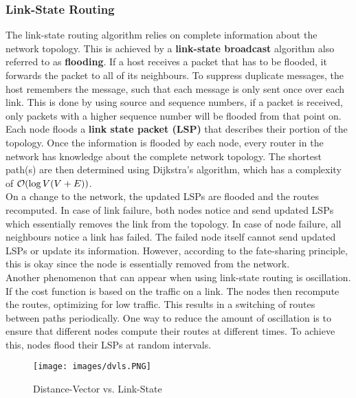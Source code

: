 \subsubsection{Link-State Routing}
The link-state routing algorithm relies on complete information about the network topology. This is achieved by a \textbf{link-state broadcast} algorithm also referred to as \textbf{flooding}. If a host receives a packet that has to be flooded, it forwards the packet to all of its neighbours. To suppress duplicate messages, the host remembers the message, such that each message is only sent once over each link. This is done by using source and sequence numbers, if a packet is received, only packets with a higher sequence number will be flooded from that point on. \vspace{.3cm}\\

Each node floods a \textbf{link state packet (LSP)} that describes their portion of the topology. Once the information is flooded by each node, every router in the network has knowledge about the complete network topology. The shortest path(s) are then determined using Dijkstra's algorithm, which has a complexity of $\mathcal{O}(\log V(V + E))$.\vspace{.3cm}\\

On a change to the network, the updated LSPs are flooded and the routes recomputed. In case of link failure, both nodes notice and send updated LSPs which essentially removes the link from the topology. In case of node failure, all neighbours notice a link has failed. The failed node itself cannot send updated LSPs or update its information. However, according to the fate-sharing principle, this is okay since the node is essentially removed from the network.\vspace{.3cm}\\

Another phenomenon that can appear when using link-state routing is oscillation. If the cost function is based on the traffic on a link. The nodes then recompute the routes, optimizing for low traffic. This results in a switching of routes between paths periodically. One way to reduce the amount of oscillation is to ensure that different nodes compute their routes at different times. To achieve this, nodes flood their LSPs at random intervals.\vspace{.2cm}\\

\begin{figure}
\centering
\texttt{[image: images/dvls.PNG]}
\caption{Distance-Vector vs. Link-State}
\label{dvls}
\end{figure}

